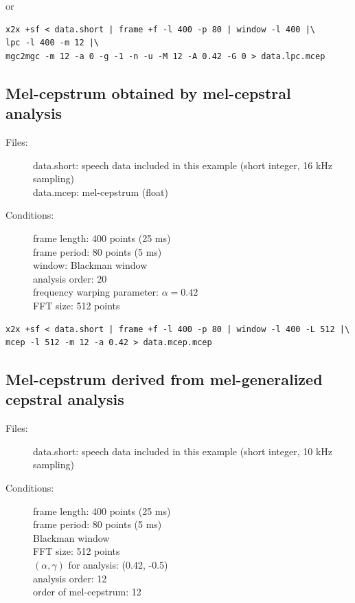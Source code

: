 \documentclass[a4paper,10pt]{article}
\begin{document}
or

\begin{verbatim}
x2x +sf < data.short | frame +f -l 400 -p 80 | window -l 400 |\
lpc -l 400 -m 12 |\
mgc2mgc -m 12 -a 0 -g -1 -n -u -M 12 -A 0.42 -G 0 > data.lpc.mcep
\end{verbatim}

\subsection{Mel-cepstrum obtained by mel-cepstral analysis}

\begin{description}
\item[Files:]
  data.short: speech data included in this example (short integer, 16 kHz sampling)\\
  data.mcep: mel-cepstrum (float)
\item[Conditions:]
  frame length: 400 points (25 ms)\\
  frame period: 80 points (5 ms)\\
  window: Blackman window\\
  analysis order: 20 \\
  frequency warping parameter: $\alpha = 0.42$\\
  FFT size: 512 points
\end{description}

\begin{verbatim}
x2x +sf < data.short | frame +f -l 400 -p 80 | window -l 400 -L 512 |\
mcep -l 512 -m 12 -a 0.42 > data.mcep.mcep
\end{verbatim}

\subsection{Mel-cepstrum derived from mel-generalized cepstral analysis}

\begin{description}
\item[Files:]
   data.short: speech data included in this example (short integer, 10 kHz sampling)\\
\item[Conditions:]
  frame length: 400 points (25 ms)\\
  frame period: 80 points (5 ms)\\
  Blackman window\\
  FFT size: 512 points\\
  $(\alpha, \gamma)$ for analysis: (0.42, -0.5)\\
  analysis order: 12\\
  order of mel-cepstrum: 12
\end{description}
\end{document}
